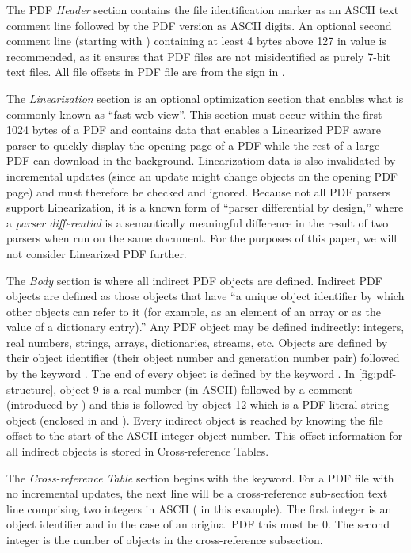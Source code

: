 The PDF \emph{Header} section contains the file identification marker as an ASCII
text comment line  followed by the PDF version as ASCII digits. 
An optional second comment line (starting with \lstcd{\%})
containing at least 4 bytes above 127 in value is recommended, as it ensures 
that PDF files are not misidentified as purely 7-bit text files. 
All file offsets in PDF file are from the \lstcd{\%} sign in .  

The \emph{Linearization} section is an optional optimization section that enables what is commonly
known as ``fast web view''. This section must occur within the first 1024 bytes of a PDF and contains
data that enables a Linearized PDF aware parser to quickly display the opening page of a PDF
while the rest of a large PDF can download in the background.
Linearizatiom data is also invalidated by incremental updates (since an update might change objects
on the opening PDF page) and must therefore be checked and ignored.
%
Because not all PDF parsers support Linearization, it is a known form
of ``parser differential by design,'' where a \emph{parser
  differential} is a semantically meaningful difference in the result
of two parsers when run on the same document.
%
For the purposes of this paper, we will not consider Linearized PDF further.

The \emph{Body} section is where all indirect PDF objects are defined. Indirect PDF objects
are defined as those objects that have ``a unique object identifier by which other objects can
refer to it (for example, as an element of an array or as the value of a dictionary entry).''
Any PDF object may be defined indirectly: integers, real numbers, strings, arrays, dictionaries, 
streams, etc. Objects are defined by their object identifier (their object number and generation 
number pair) followed by the keyword . 
The end of every object is defined by the keyword .
In \cref{fig:pdf-structure}, object 9 is a real number (in ASCII) followed by a comment
(introduced by \lstcd{\%}) and this is followed by object 12 which is a PDF literal string object
(enclosed in \lstcd{(} and \lstcd{)}).  
Every indirect object is reached by knowing the file offset to the start of the ASCII integer 
object number. This offset information for all indirect objects is stored in Cross-reference Tables.

The \emph{Cross-reference Table} section begins with the  keyword. For a PDF file
with no incremental updates, the next line will be a cross-reference sub-section text line comprising
two integers in ASCII ( in this example). The first integer is an object identifier 
and in the case of an original PDF this must be 0. The second integer is the number of
objects in the cross-reference subsection.

